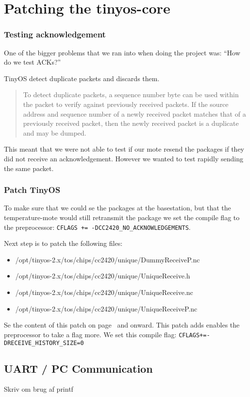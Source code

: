 \section{Patching the tinyos-core}

\subsubsection{Testing acknowledgement}
One of the bigger problems that we ran into when doing the project was: ``How
do we test ACKs?''

TinyOS detect duplicate packets and discards them.

\begin{quote}
To detect duplicate packets, a sequence number byte can be used within the
packet to verify against previously received packets. If the source address and
sequence number of a newly received packet matches that of a previously
received packet, then the newly received packet is a duplicate and may be
dumped.\cite[chapter 2.2]{PaketLink}
\end{quote}


This meant that we were not
able to test if our mote resend the packages if they did not receive an
acknowledgement. However we wanted to test rapidly sending the
same packet. 

\subsubsection{Patch TinyOS}

To make sure that we could se the packages at the basestation, but that the
temperature-mote would still retransmit the package we set the compile flag to
the preprocessor: \texttt{CFLAGS += -DCC2420\_NO\_ACKNOWLEDGEMENTS}.

Next step is to patch the following files: 

\begin{itemize}
	\item /opt/tinyos-2.x/tos/chips/cc2420/unique/DummyReceiveP.nc
	\item /opt/tinyos-2.x/tos/chips/cc2420/unique/UniqueReceive.h
	\item /opt/tinyos-2.x/tos/chips/cc2420/unique/UniqueReceive.nc
	\item /opt/tinyos-2.x/tos/chips/cc2420/unique/UniqueReceiveP.nc
\end{itemize}

Se the content of this patch on page~\pageref{src:uniqRecP} and onward. This
patch adds enables the preprocessor to take a flag more. We set this compile
flag: \texttt{CFLAGS+=-DRECEIVE\_HISTORY\_SIZE=0}

\subsection{UART / PC Communication}
Skriv om brug af printf
	
